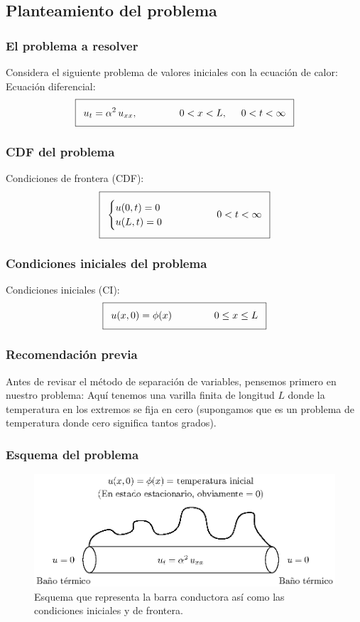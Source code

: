 \documentclass[12pt]{beamer}
\begin{document}
\subsection{Planteamiento del problema}

\begin{frame}
\frametitle{El problema a resolver}
Considera el siguiente problema de valores iniciales con la ecuación de calor:
\\
\bigskip
\pause
Ecuación diferencial:
\begin{align*}
\addtolength{\fboxsep}{5pt}\boxed{ u_{t} = \alpha^{2} \, u_{xx}, \hspace{1.5cm} 0 < x < L,\hspace{0.5cm} 0 < t < \infty}
\end{align*}
\end{frame}
\begin{frame}
\frametitle{CDF del problema}
Condiciones de frontera (CDF):
\pause
\begin{align*}
\addtolength{\fboxsep}{5pt}\boxed{
\begin{cases}
u (0, t) = 0 \\
u (L, t) = 0
\end{cases}
\hspace{1.5cm}
0 < t < \infty }
\end{align*}
\end{frame}
\begin{frame}
\frametitle{Condiciones iniciales del problema}
Condiciones iniciales (CI):
\pause
\begin{align*}
\addtolength{\fboxsep}{5pt}\boxed{
u (x, 0) = \phi (x) \hspace{1.5cm} 0 \leq x \leq L
}
\end{align*}
\end{frame}
\begin{frame}
\frametitle{Recomendación previa}
Antes de revisar el método de separación de variables, pensemos primero en nuestro problema: \pause Aquí tenemos una varilla finita de longitud $L$ donde la temperatura en los extremos se fija en cero (supongamos que es un problema de temperatura donde cero significa tantos grados).
\end{frame}
\begin{frame}
\frametitle{Esquema del problema}
\begin{figure}[H]
    \centering
    \includegraphics[scale=0.9]{Imagenes/Separacion_Variables_00_Barra.eps}
    \caption{Esquema que representa la barra conductora así como las condiciones iniciales y de frontera.}
    \label{fig:figura_barra_01}
\end{figure}
\end{frame}
\end{document}
